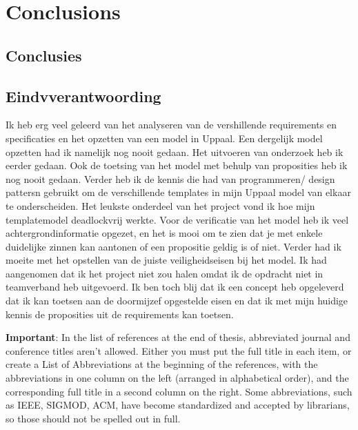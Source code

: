 \chapter{Conclusions}
\label{chapter:Conclusions}
\thispagestyle{myheadings}

\graphicspath{{4_Conclusion/Figures/}}


\section{Conclusies}


\newpage
\section{Eindvverantwoording}

Ik heb erg veel geleerd van het analyseren van de vershillende requirements en specificaties en het opzetten van een model in Uppaal. Een dergelijk model opzetten had ik namelijk nog nooit gedaan. Het uitvoeren van onderzoek heb ik eerder gedaan. Ook de toetsing van het model met behulp van proposities heb ik nog nooit gedaan. Verder heb ik de kennis die had van programmeren/ design pattersn gebruikt om de verschillende templates in mijn Uppaal model van elkaar te onderscheiden. Het leukste onderdeel van het project vond ik hoe mijn templatemodel deadlockvrij werkte. Voor de verificatie van het model heb ik veel achtergrondinformatie opgezet, en het is mooi om te zien dat je met enkele duidelijke zinnen kan aantonen of een propositie geldig is of niet.  Verder had ik moeite met het opstellen van de juiste veiligheidseisen bij het model. Ik had aangenomen dat ik het project niet zou halen omdat ik de opdracht niet in teamverband heb uitgevoerd. Ik ben toch blij dat ik een concept heb opgeleverd dat ik kan toetsen aan de doormijzef opgestelde eisen en dat ik met mijn huidige kennis de proposities uit de requirements kan toetsen.



{\bf Important}: In the list of references at the end of thesis, abbreviated journal and conference titles aren't allowed. Either you must put the full title in each item, or create a List of Abbreviations at the beginning of the references, with the abbreviations in one column on the left (arranged in alphabetical order), and the corresponding full title in a second column on the right.  Some abbreviations, such as IEEE, SIGMOD, ACM, have become standardized and accepted by librarians, so those should not be spelled out in full.



